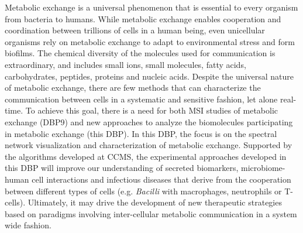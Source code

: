 \documentclass[arial,11pt]{article}
\begin{document}
Metabolic exchange is a universal phenomenon that is essential to every organism from
bacteria
to humans. While metabolic exchange enables cooperation and coordination between
trillions of cells in a  human being, even unicellular organisms rely on metabolic exchange to adapt to environmental stress and form biofilms.
%
The chemical diversity of the molecules used for communication is extraordinary, and includes small ions, small molecules, fatty acids,  carbohydrates, peptides, proteins and nucleic acids. Despite the universal nature of metabolic exchange, there are few methods that can characterize the communication
between cells in a systematic and sensitive fashion, let alone real-time.
To achieve this goal, there is a need for both MSI studies of metabolic exchange (DBP9) and new approaches to analyze the biomolecules participating in metabolic exchange (this DBP).
In this DBP, the focus is on
the spectral network visualization and characterization of metabolic exchange.
Supported by the algorithms  developed at CCMS, the experimental approaches developed in this DBP will improve our understanding of secreted biomarkers, microbiome-human cell interactions and
infectious diseases that derive from the cooperation between different types of cells (e.g. {\em Bacilli} with macrophages, neutrophils or T-cells).
Ultimately,  it may drive the development of new therapeutic strategies
based on paradigms involving inter-cellular metabolic communication in a system wide fashion.

\end{document}

